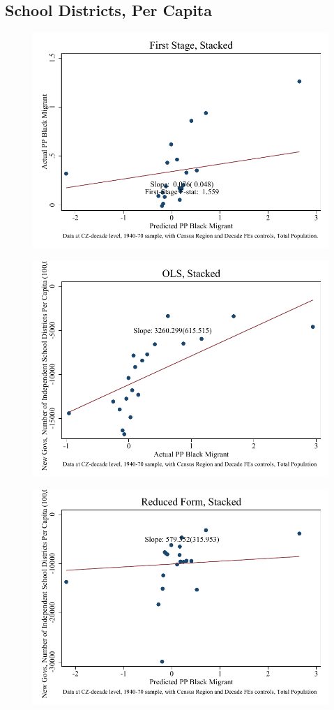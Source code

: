 \documentclass{article}
\begin{document}
\subsection{School Districts, Per Capita}

\clearpage
\begin{figure}
\centering
\includegraphics{figures/simplefigs/stacked_schdist_ind_pc_C3_total_fs.pdf}
\end{figure}
\clearpage
\begin{figure}
\centering
\includegraphics{figures/simplefigs/stacked_schdist_ind_pc_C3_total_ols.pdf}
\end{figure}
\clearpage
\begin{figure}
\centering
\includegraphics{figures/simplefigs/stacked_schdist_ind_pc_C3_total_rf.pdf}
\end{figure}
\clearpage
\end{document}
